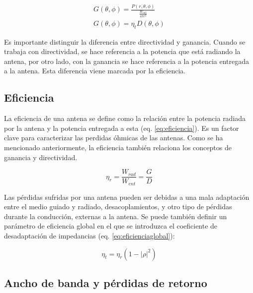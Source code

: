 \begin{subequations}
	\begin{eqnarray}
		G(\theta, \phi)=\frac{P(r,\theta, \phi)}{\frac{W_{ent}}{4\pi r^2}} \label{eq:ganancia} \\ %
		G(\theta, \phi)=\eta_{t} D(\theta, \phi) \label{eq:ganaciadirect}
	\end{eqnarray}
\end{subequations}

\par Es importante distinguir la diferencia entre directividad y ganancia. Cuando se trabaja con directividad, se hace referencia a la potencia que está radiando la antena, por otro lado, con la ganancia se hace referencia a la potencia entregada a la antena. Esta diferencia viene marcada por la eficiencia.

\subsection{Eficiencia}

\par La eficiencia de una antena se define como la relación entre la potencia radiada por la antena y la potencia entregada a esta (eq. \ref{eq:eficiencia}). Es un factor clave para caracterizar las perdidas óhmicas de las antenas. Como se ha mencionado anteriormente, la eficiencia también relaciona los conceptos de ganancia y directividad.

\begin{equation}
	\eta_{r} = \frac{W_{rad}}{W_{ent}}= \frac{G}{D}
	\label{eq:eficiencia}
\end{equation}

\par Las pérdidas sufridas por una antena pueden ser debidas a una mala adaptación entre el medio guiado y radiado, desacoplamientos, y otro tipo de pérdidas durante la conducción, externas a la antena. Se puede también definir un parámetro de eficiencia global en el que se introduzca el coeficiente de desadaptación de impedancias (eq. \ref{eq:eficienciaglobal}):

\begin{equation}
	\eta _{t}=\eta _{r}(1-\left | \rho  \right |^2)
	\label{eq:eficienciaglobal}
\end{equation}

\subsection{Ancho de banda y pérdidas de retorno}

